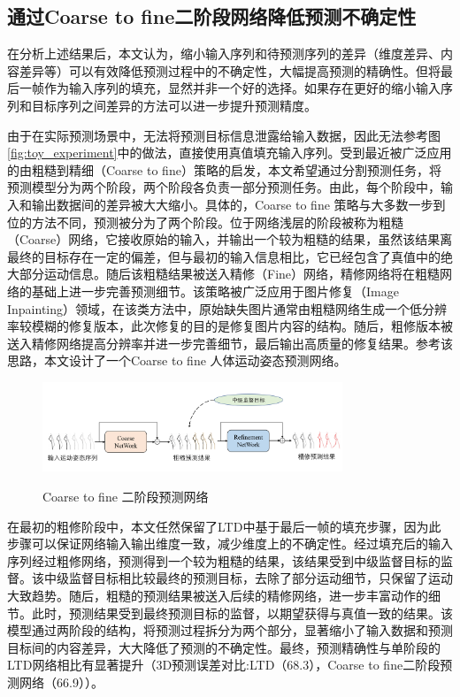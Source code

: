 \subsection{通过Coarse to fine二阶段网络降低预测不确定性}
在分析上述结果后，本文认为，缩小输入序列和待预测序列的差异（维度差异、内容差异等）可以有效降低预测过程中的不确定性，大幅提高预测的精确性。但将最后一帧作为输入序列的填充，显然并非一个好的选择。如果存在更好的缩小输入序列和目标序列之间差异的方法可以进一步提升预测精度。

由于在实际预测场景中，无法将预测目标信息泄露给输入数据，因此无法参考图\ref{fig:toy_experiment}中的做法，直接使用真值填充输入序列。受到最近被广泛应用的由粗糙到精细（Coarse to fine）策略的启发，本文希望通过分割预测任务，将预测模型分为两个阶段，两个阶段各负责一部分预测任务。由此，每个阶段中，输入和输出数据间的差异被大大缩小。具体的，Coarse to fine 策略与大多数一步到位的方法不同，预测被分为了两个阶段。位于网络浅层的阶段被称为粗糙（Coarse）网络，它接收原始的输入，并输出一个较为粗糙的结果，虽然该结果离最终的目标存在一定的偏差，但与最初的输入信息相比，它已经包含了真值中的绝大部分运动信息。随后该粗糙结果被送入精修（Fine）网络，精修网络将在粗糙网络的基础上进一步完善预测细节。该策略被广泛应用于图片修复（Image Inpainting）\parencite{yu2018generative,zamir2021multi}领域，在该类方法中，原始缺失图片通常由粗糙网络生成一个低分辨率较模糊的修复版本，此次修复的目的是修复图片内容的结构。随后，粗修版本被送入精修网络提高分辨率并进一步完善细节，最后输出高质量的修复结果。参考该思路，本文设计了一个Coarse to fine 人体运动姿态预测网络。

\begin{figure}[ht]
    \centering
    \includegraphics[width=0.8\textwidth]{FigMa/Two_stage.png}\\
    \vspace{-0.3cm}
    \caption{Coarse to fine 二阶段预测网络}
    \label{fig:Two_stage}
\end{figure}

在最初的粗修阶段中，本文任然保留了LTD中基于最后一帧的填充步骤，因为此步骤可以保证网络输入输出维度一致，减少维度上的不确定性。经过填充后的输入序列经过粗修网络，预测得到一个较为粗糙的结果，该结果受到中级监督目标的监督。该中级监督目标相比较最终的预测目标，去除了部分运动细节，只保留了运动大致趋势。随后，粗糙的预测结果被送入后续的精修网络，进一步丰富动作的细节。此时，预测结果受到最终预测目标的监督，以期望获得与真值一致的结果。该模型通过两阶段的结构，将预测过程拆分为两个部分，显著缩小了输入数据和预测目标间的内容差异，大大降低了预测的不确定性。最终，预测精确性与单阶段的LTD网络相比有显著提升（3D预测误差对比:LTD（68.3），Coarse to fine二阶段预测网络（66.9））。
